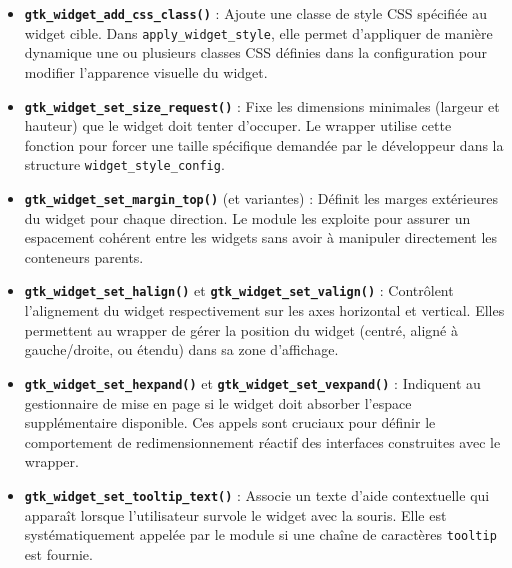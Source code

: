 \begin{itemize}
    \item \textbf{\texttt{gtk\_widget\_add\_css\_class()}} : Ajoute une classe de style CSS spécifiée au widget cible. Dans \texttt{apply\_widget\_style}, elle permet d'appliquer de manière dynamique une ou plusieurs classes CSS définies dans la configuration pour modifier l'apparence visuelle du widget.
    \item \textbf{\texttt{gtk\_widget\_set\_size\_request()}} : Fixe les dimensions minimales (largeur et hauteur) que le widget doit tenter d'occuper. Le wrapper utilise cette fonction pour forcer une taille spécifique demandée par le développeur dans la structure \texttt{widget\_style\_config}.
    \item \textbf{\texttt{gtk\_widget\_set\_margin\_top()}} (et variantes) : Définit les marges extérieures du widget pour chaque direction. Le module les exploite pour assurer un espacement cohérent entre les widgets sans avoir à manipuler directement les conteneurs parents.
    \item \textbf{\texttt{gtk\_widget\_set\_halign()}} et \textbf{\texttt{gtk\_widget\_set\_valign()}} : Contrôlent l'alignement du widget respectivement sur les axes horizontal et vertical. Elles permettent au wrapper de gérer la position du widget (centré, aligné à gauche/droite, ou étendu) dans sa zone d'affichage.
    \item \textbf{\texttt{gtk\_widget\_set\_hexpand()}} et \textbf{\texttt{gtk\_widget\_set\_vexpand()}} : Indiquent au gestionnaire de mise en page si le widget doit absorber l'espace supplémentaire disponible. Ces appels sont cruciaux pour définir le comportement de redimensionnement réactif des interfaces construites avec le wrapper.
    \item \textbf{\texttt{gtk\_widget\_set\_tooltip\_text()}} : Associe un texte d'aide contextuelle qui apparaît lorsque l'utilisateur survole le widget avec la souris. Elle est systématiquement appelée par le module si une chaîne de caractères \texttt{tooltip} est fournie.
\end{itemize}

\newpage
